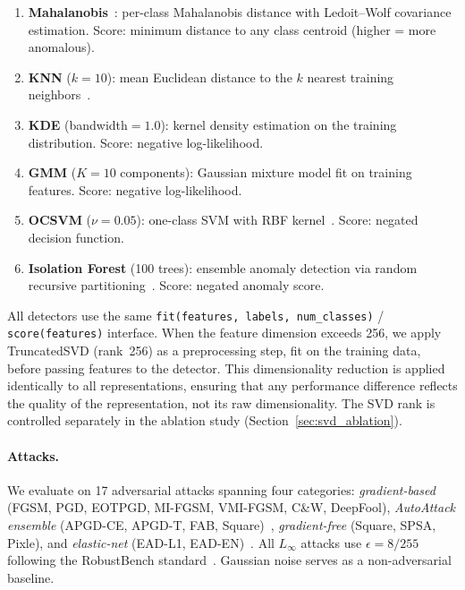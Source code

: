 \begin{enumerate}
    \item \textbf{Mahalanobis}~\citep{lee2018simple}: per-class Mahalanobis distance with Ledoit--Wolf covariance estimation.
    Score: minimum distance to any class centroid (higher = more anomalous).

    \item \textbf{KNN} ($k{=}10$): mean Euclidean distance to the $k$ nearest training neighbors~\citep{sun2022knnood}.

    \item \textbf{KDE} (bandwidth${=}1.0$): kernel density estimation on the training distribution.
    Score: negative log-likelihood.

    \item \textbf{GMM} ($K{=}10$ components): Gaussian mixture model fit on training features.
    Score: negative log-likelihood.

    \item \textbf{OCSVM} ($\nu{=}0.05$): one-class SVM with RBF kernel~\citep{scholkopf2001estimating}.
    Score: negated decision function.

    \item \textbf{Isolation Forest} (100 trees): ensemble anomaly detection via random recursive partitioning~\citep{liu2008isolation}.
    Score: negated anomaly score.
\end{enumerate}

All detectors use the same \texttt{fit(features, labels, num\_classes)} / \texttt{score(features)} interface.
When the feature dimension exceeds 256, we apply TruncatedSVD (rank~256) as a preprocessing step, fit on the training data, before passing features to the detector.
This dimensionality reduction is applied identically to all representations, ensuring that any performance difference reflects the quality of the representation, not its raw dimensionality.
The SVD rank is controlled separately in the ablation study (Section~\ref{sec:svd_ablation}).

\paragraph{Attacks.}
We evaluate on 17 adversarial attacks spanning four categories:
\emph{gradient-based} (FGSM, PGD, EOTPGD, MI-FGSM, VMI-FGSM, C\&W, DeepFool),
\emph{AutoAttack ensemble} (APGD-CE, APGD-T, FAB, Square)~\citep{croce2020reliable},
\emph{gradient-free} (Square, SPSA, Pixle), and
\emph{elastic-net} (EAD-L1, EAD-EN)~\citep{chen2018ead}.
All $L_\infty$ attacks use $\epsilon = 8/255$ following the RobustBench standard~\citep{croce2021robustbench}.
Gaussian noise serves as a non-adversarial baseline.

